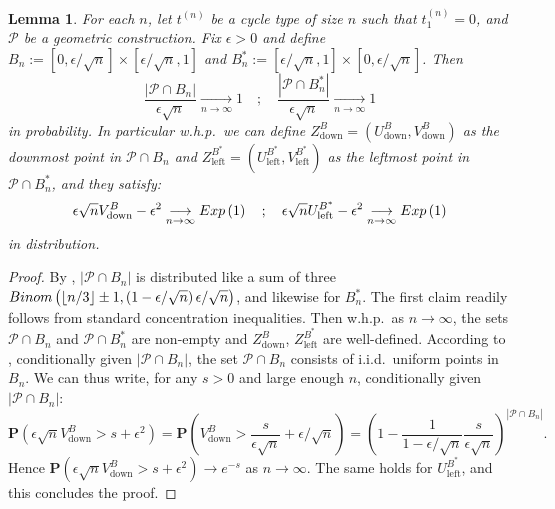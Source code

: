 \documentclass{article}
\newtheorem{lem}[theorem]{Lemma}
\theoremstyle{remark}
\newcommand{\cv}[2]{\underset{#1\to#2}{\longrightarrow}}
\newcommand{\card}[1]{\left|#1\right|}
\newcommand{\prob}[1]{\mathbf{P}\left(#1\right)}
\newcommand{\Exp}[1]{{\rm Exp}\left(#1\right)}
\newcommand{\Binomial}[2]{{\rm Binom}\left(#1 , #2\right)}
\def\pts{\mathcal{P}}
\begin{document}
\begin{lem}\label{lem: downmost and leftmost points in bands}
    For each $n$, let $t^{(n)}$ be a cycle type of size $n$ such that $t_1^{(n)}=0$, and $\pts$ be a geometric construction.
    Fix $\epsilon>0$ and define $B_n := \left[0, \epsilon/ \sqrt{n}\right] \times \left[\epsilon/ \sqrt{n} ,1\right]$ and $B_n^* := \left[\epsilon/ \sqrt{n} ,1\right] \times \left[0, \epsilon/ \sqrt{n}\right]$.
    Then
    \begin{equation*}
        \frac{\card{\pts\cap B_n}}{\epsilon\sqrt n} \cv{n}{\infty} 1
        \quad;\quad
        \frac{\card{\pts\cap B_n^*}}{\epsilon\sqrt n} \cv{n}{\infty} 1
    \end{equation*}
    in probability.
    In particular w.h.p.~we can define $Z_\text{down}^{B} = \left(U_\text{down}^B , V_\text{down}^B\right)$ as the downmost point in $\pts\cap B_n$ and $Z_\text{left}^{B^*} = \left(U_\text{left}^{B^*} , V_\text{left}^{B^*}\right)$ as the leftmost point in $\pts\cap B_n^*$, and they satisfy:
    \begin{equation*}
        {\epsilon\sqrt{n}}V_\text{down}^B -\epsilon^2 \cv{n}{\infty} \Exp{1}
        \quad;\quad
        {\epsilon\sqrt{n}}U_\text{left}^{B^*} -\epsilon^2 \cv{n}{\infty} \Exp{1}
    \end{equation*}
    in distribution.
\end{lem}

\begin{proof}
    By , $\card{\pts\cap B_n}$ is distributed like a sum of three $\Binomial{\lfloor n/3\rfloor \pm1}{\left(1-\epsilon/\sqrt n\right) \big. \epsilon/\sqrt n}$, and likewise for $B_n^*$.
    The first claim readily follows from standard concentration inequalities.
    Then w.h.p.~as $n\to\infty$, the sets $\pts\cap B_n$ and $\pts\cap B_n^*$ are non-empty and $Z_\text{down}^B$, $Z_\text{left}^{B^*}$ are well-defined.
    According to , conditionally given $\card{\pts\cap B_n}$, the set $\pts\cap B_n$ consists of i.i.d.~uniform points in $B_n$.
    We can thus write, for any $s>0$ and large enough $n$, conditionally given $\card{\pts\cap B_n}$:
    \begin{equation*}
        \prob{\epsilon\sqrt{n}V_\text{down}^B > s+\epsilon^2}
        = \prob{V_\text{down}^B > \frac{s}{\epsilon\sqrt n}+\epsilon/\sqrt{n}}
        = \left(1 - \frac{1}{1-\epsilon/\sqrt n}\frac{s}{\epsilon\sqrt n}\right)^{\card{\pts\cap B_n}} .
    \end{equation*}
    Hence $\prob{\epsilon\sqrt{n}V_\text{down}^B > s+\epsilon^2} \to e^{-s}$ as $n\to\infty$.
    The same holds for $U_\text{left}^{B^*}$, and this concludes the proof.
\end{proof}
\end{document}
